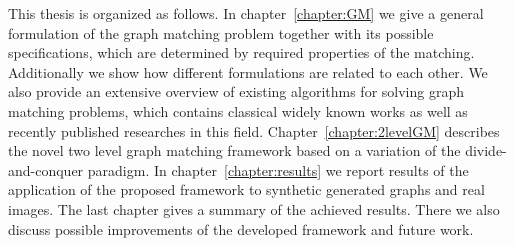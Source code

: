 This thesis is organized as follows. In chapter~\ref{chapter:GM} we give a general formulation of the graph matching problem together with its possible specifications, which are determined by required properties of the matching. Additionally we show how different formulations are related to each other. We also provide an extensive overview of existing algorithms for solving graph matching problems, which contains classical widely known works as well as recently published researches in this field.
Chapter~\ref{chapter:2levelGM} describes the novel two level graph matching framework based on a variation of the divide-and-conquer paradigm. %
In chapter~\ref{chapter:results} we report results of the application of the proposed framework to synthetic generated graphs and real images. The last chapter gives a summary of the achieved results. There we also discuss possible improvements of the developed framework and future work.
